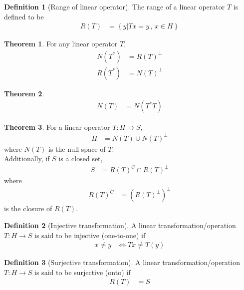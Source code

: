 \documentclass[titlepage, fleqn, a4paper, 12pt, twoside]{article}
\theoremstyle{definition}
\newtheorem{definition}{Definition}
\theoremstyle{theorem}
\newtheorem{theorem}{Theorem}
\begin{document}
\begin{definition}[Range of linear operator]
	The range of a linear operator $T$ is defined to be
	\begin{align*}
		R(T) &= \left\{ y \Big| T x = y \, , \, x \in H \right\}
	\end{align*}
\end{definition}

\begin{theorem}
	For any linear operator $T$,
	\begin{align*}
		N\left( T^* \right) &= {R(T)}^{\perp}\\
		R\left( T^* \right) &= {N(T)}^{\perp}
	\end{align*}
\end{theorem}

\begin{theorem}
	\begin{align*}
		N(T) &= N\left( T^* T \right)
	\end{align*}
\end{theorem}

\begin{theorem}
	For a linear operator $T: H \to S$,
	\begin{align*}
		H &= N(T) \cup N(T)^{\perp}
	\end{align*}
	where $N(T)$ is the null space of $T$.\\
	Additionally, if $S$ is a closed set,
	\begin{align*}
		S &= R(T)^{C} \cap R(T)^{\perp}
	\end{align*}
	where
	\begin{align*}
		R(T)^{C} &= \left( R(T)^{\perp} \right)^{\perp}
	\end{align*}
	is the closure of $R(T)$.
\end{theorem}

\begin{definition}[Injective transformation]
	A linear transformation/operation $T: H \to S$ is said to be injective (one-to-one) if
	\begin{align*}
		x \neq y &\iff T x \neq T(y)
	\end{align*}
\end{definition}

\begin{definition}[Surjective transformation]
	A linear transformation/operation $T: H \to S$ is said to be surjective (onto) if
	\begin{align*}
		R(T) &= S
	\end{align*}
\end{definition}
\end{document}
